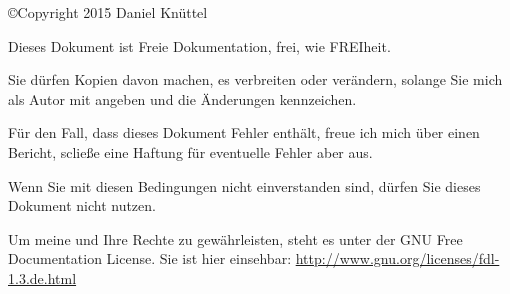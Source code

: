 \documentclass[a4paper,12pt,oneside]{scrreprt}
\begin{document}
\copyright Copyright 2015 Daniel Knüttel

Dieses Dokument ist Freie Dokumentation, frei, wie FREIheit.

Sie dürfen Kopien davon machen, es verbreiten oder verändern, solange Sie mich als Autor mit angeben und die Änderungen kennzeichen.

Für den Fall, dass dieses Dokument Fehler enthält, freue ich mich über einen Bericht, scließe eine Haftung für eventuelle Fehler aber aus.

Wenn Sie mit diesen Bedingungen nicht einverstanden sind, dürfen Sie dieses Dokument nicht nutzen.

Um meine und Ihre Rechte zu gewährleisten, steht es unter der GNU Free Documentation License. Sie ist hier einsehbar: \url{http://www.gnu.org/licenses/fdl-1.3.de.html}
\end{document}
